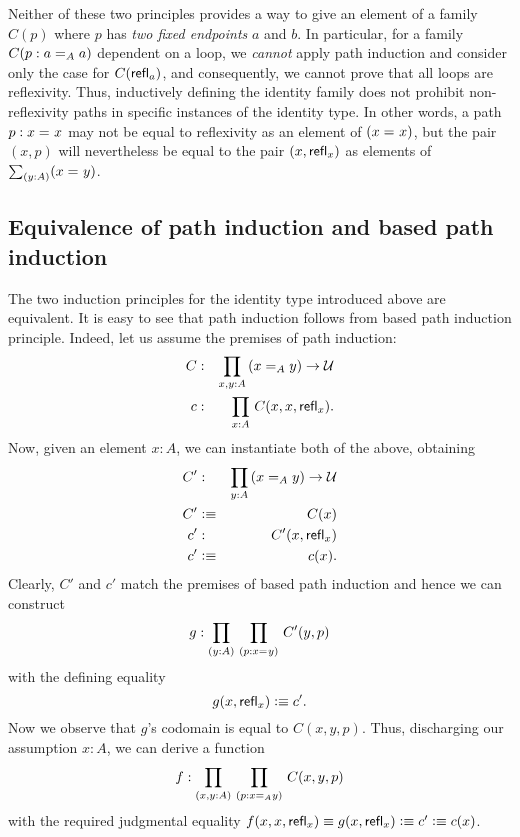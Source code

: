 \begin{rmk}
Neither of these two principles provides a way to give an element of a family $C(p)$ where $p$ has \emph{two fixed endpoints} $a$ and $b$.  In particular, for a family $C(p : \id[A]{a}{a})$ dependent on a loop, we \emph{cannot} apply path induction and consider only the case for $C(\refl{a})$, and consequently, we cannot prove
that all loops are reflexivity.  Thus, inductively defining the identity family does not prohibit non-reflexivity paths in specific instances of the identity type.
In other words, a path $p:\id{x}{x}$ may not be equal to reflexivity as an element of $(\id{x}{x})$, but the pair $(x,p)$ will nevertheless be equal to the pair $(x,\refl{x})$ as elements of $\sm{y:A}(\id{x}{y})$.
\end{rmk}

%
%

\subsection{Equivalence of path induction and based path induction}

The two induction principles for the identity type introduced above are equivalent.
It is easy to see that path induction follows from based path induction principle.
Indeed, let us assume the premises of path induction:
\begin{eqnarray*}
C & : & \prd{x,y:A}(\id[A]{x}{y}) \to \UU  \\
c & :  & \prd{x:A} C(x,x,\refl{x}).
\end{eqnarray*}
Now, given an element $x:A$, we can instantiate both of the above, obtaining
\begin{eqnarray*}
C' & : & \prd{y:A} (\id[A]{x}{y}) \to \UU  \\
C' & \defeq & C(x) \\
c' & : & C'(x,\refl{x}) \\
c' & \defeq & c(x).
\end{eqnarray*}
Clearly, $C'$ and $c'$ match the premises of based path induction and hence we can construct 
\begin{eqnarray*}
g : \prd{y:A}{p : \id{x}{y}} C'(y,p)
\end{eqnarray*}
with the defining equality
\[ g(x,\refl{x}) \defeq c' .\]
Now we observe that $g$'s codomain is equal to $C(x,y,p)$.
Thus, discharging our assumption $x:A$, we can derive a function 
\[ f : \prd{x,y:A}{p : \id[A]{x}{y}} C(x,y,p) \]
with the required judgmental equality $f(x,x,\refl{x}) \judgeq g(x,\refl{x}) \defeq c' \defeq c(x)$.

